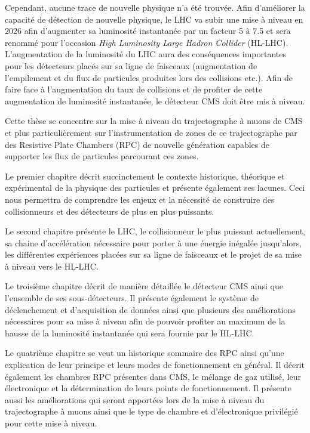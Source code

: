Cependant, aucune trace de nouvelle physique n'a été trouvée. Afin d'améliorer la capacité de détection de nouvelle physique, le LHC va subir une mise à niveau en \num{2026} afin d'augmenter sa luminosité instantanée par un facteur \num{5} à \num{7.5} et sera renommé pour l'occasion \textit{High Luminosity Large Hadron Collider} (HL-LHC). L'augmentation de la luminosité du LHC aura des conséquences importantes pour les détecteurs placés sur sa ligne de faisceaux (augmentation de l'empilement et du flux de particules produites lors des collisions etc.). Afin de faire face à l'augmentation du taux de collisions et de profiter de cette augmentation de luminosité instantanée, le détecteur CMS doit être mis à niveau. 

Cette thèse se concentre sur la mise à niveau du trajectographe à muons de CMS et plus particulièrement sur l'instrumentation de zones de ce trajectographe par des Resistive Plate Chambers (RPC) de nouvelle génération capables de supporter les flux de particules parcourant ces zones. 

Le premier chapitre décrit succinctement le contexte historique, théorique et expérimental de la physique des particules et présente également ses lacunes. Ceci nous permettra de comprendre les enjeux et la nécessité de construire des collisionneurs et des détecteurs de plus en plus puissants.

Le second chapitre présente le LHC, le collisionneur le plus puissant actuellement, sa chaine d'accélération nécessaire pour porter à une énergie inégalée jusqu'alors, les différentes expériences placées sur sa ligne de faisceaux et le projet de sa mise à niveau vers le HL-LHC.

Le troisième chapitre décrit de manière détaillée le détecteur CMS ainsi que l'ensemble de ses sous-détecteurs. Il présente également le système de déclenchement et d'acquisition de données ainsi que plusieurs des améliorations nécessaires pour sa mise à niveau afin de pouvoir profiter au maximum de la hausse de la luminosité instantanée qui sera fournie par le HL-LHC.

Le quatrième chapitre se veut un historique sommaire des RPC ainsi qu'une explication de leur principe et leurs modes de fonctionnement en général. Il décrit également les chambres RPC présentes dans CMS, le mélange de gaz utilisé, leur électronique et la détermination de leurs points de fonctionnement. Il présente aussi les améliorations qui seront apportées lors de la mise à niveau du trajectographe à muons ainsi que le type de chambre et d'électronique privilégié pour cette mise à niveau.

